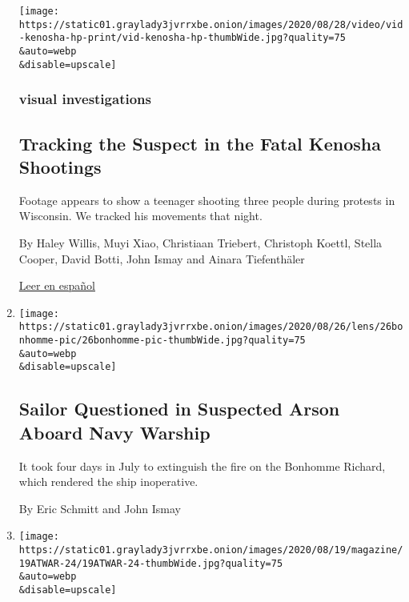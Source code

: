 \begin{enumerate}
  \texttt{[image: https://static01.graylady3jvrrxbe.onion/images/2020/08/28/video/vid-kenosha-hp-print/vid-kenosha-hp-thumbWide.jpg?quality=75\\\&auto=webp\\\&disable=upscale]}

  \hypertarget{visual-investigations}{%
  \subsubsection{visual investigations}\label{visual-investigations}}

  \hypertarget{tracking-the-suspect-in-the-fatal-kenosha-shootings}{%
  \subsection{Tracking the Suspect in the Fatal Kenosha
  Shootings}\label{tracking-the-suspect-in-the-fatal-kenosha-shootings}}

  Footage appears to show a teenager shooting three people during
  protests in Wisconsin. We tracked his movements that night.

  By Haley Willis, Muyi Xiao, Christiaan Triebert, Christoph Koettl,
  Stella Cooper, David Botti, John Ismay and Ainara Tiefenthäler

  \href{https://www.nytimes3xbfgragh.onion/es/2020/08/27/espanol/estados-unidos/kyle-rittenhouse-kenosha-wisconsin.html}{Leer
  en español}
\item
  \href{/2020/08/27/us/navy-bonhomme-richard-arson-fire.html}{}

  \texttt{[image: https://static01.graylady3jvrrxbe.onion/images/2020/08/26/lens/26bonhomme-pic/26bonhomme-pic-thumbWide.jpg?quality=75\\\&auto=webp\\\&disable=upscale]}

  \hypertarget{sailor-questioned-in-suspected-arson-aboard-navy-warship}{%
  \subsection{Sailor Questioned in Suspected Arson Aboard Navy
  Warship}\label{sailor-questioned-in-suspected-arson-aboard-navy-warship}}

  It took four days in July to extinguish the fire on the Bonhomme
  Richard, which rendered the ship inoperative.

  By Eric Schmitt and John Ismay
\item
  \href{/2020/08/19/magazine/black-marines-mutiny.html}{}

  \texttt{[image: https://static01.graylady3jvrrxbe.onion/images/2020/08/19/magazine/19ATWAR-24/19ATWAR-24-thumbWide.jpg?quality=75\\\&auto=webp\\\&disable=upscale]}


\end{enumerate}
